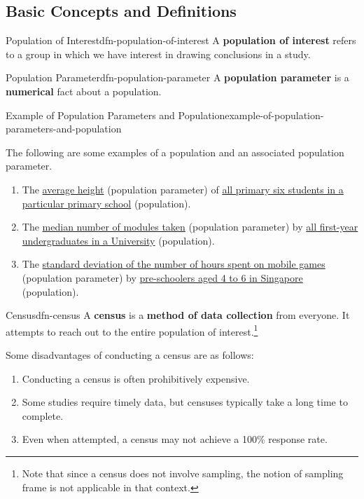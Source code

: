 \documentclass[math,code]{amznotes}
\theoremstyle{remark}
\begin{document}
\subsection{Basic Concepts and Definitions}
\begin{dfnbox}{Population of Interest}{dfn-population-of-interest}
    A {\color{red} \textbf{population of interest}} refers to a group in which we have interest in drawing conclusions in a study.
\end{dfnbox}
\begin{dfnbox}{Population Parameter}{dfn-population-parameter}
    A {\color{red} \textbf{population parameter}} is a \textbf{numerical} fact about a population.
\end{dfnbox}
\begin{exbox}{Example of Population Parameters and Population}{example-of-population-parameters-and-population}
    \raggedright %
    The following are some examples of a population and an associated population parameter.
    \begin{enumerate}
        \item The \underline{average height} (population parameter) of \underline{all primary six students in a particular primary school} (population).
        \item The \underline{median number of modules taken} (population parameter) by \underline{all first-year undergraduates in a University} (population).
        \item The \underline{standard deviation of the number of hours spent on mobile games} (population parameter) by \underline{pre-schoolers aged 4 to 6 in Singapore} (population).
    \end{enumerate}
\end{exbox}
\begin{dfnbox}{Census}{dfn-census}
    A {\color{red} \textbf{census}} is a \textbf{method of data collection} from everyone. It attempts to reach out to the entire population of interest.\footnote{Note that since a census does
not involve sampling, the notion of sampling frame is not applicable in that context.}
\end{dfnbox}
Some disadvantages of conducting a census are as follows:
\begin{enumerate}
    \item Conducting a census is often prohibitively expensive.
    \item Some studies require timely data, but censuses typically take a long time to complete.
    \item Even when attempted, a census may not achieve a 100\% response rate.
\end{enumerate}
\end{document}
